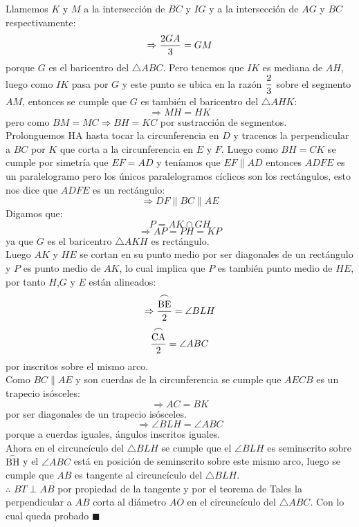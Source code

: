\documentclass{book}
\begin{document}
\begin{enumerate}
\begin{center}
        \end{center}
        Llamemos $K$ y $M$ a la intersección de $BC$ y $IG$ y a la intersección de $AG$ y $BC$ respectivamente:
        $$\Rightarrow{2GA\over 3}=GM$$
        porque $G$ es el baricentro del $\triangle ABC$. Pero tenemos que $IK$ es mediana de $AH$, luego como $IK$ pasa por $G$ y este punto se ubica en la razón  $\displaystyle{{2\over 3}}$  sobre el segmento $AM$, entonces se cumple que $G$ es también el baricentro del $\triangle AHK$:
        $$\Rightarrow MH=HK$$
        pero como $BM=MC\Rightarrow BH=KC$ por sustracción de segmentos.\\
        Prolonguemos HA hasta tocar la circunferencia en $D$ y tracenos la perpendicular a $BC$ por $K$ que corta a la circunferencia en $E$ y $F$. Luego como $BH=CK$ se cumple por simetría que $EF=AD$ y teníamos que $EF\parallel AD$ entonces $ADFE$ es un paralelogramo pero los únicos paralelogramos cíclicos son los rectángulos, esto nos dice que $ADFE$ es un rectángulo:\\
        $$\Rightarrow DF\parallel BC\parallel AE$$
        Digamos que:
        $$P=AK\cap GH$$
        $$\Rightarrow AP=PH=KP$$
        ya que $G$ es el baricentro $\triangle AKH$ es rectángulo.\\
        Luego $AK$ y $HE$ se cortan en su punto medio por ser diagonales de un rectángulo y $P$ es punto medio de $AK$, lo cual implica que $P$ es también punto medio de $HE$, por tanto $H$,$G$ y $E$ están alineados:
        $$\Rightarrow{\stackrel{\textstyle\frown}{\mathrm{BE}}\over 2}=\angle BLH$$
        $${\stackrel{\textstyle\frown}{\mathrm{CA}}\over 2}=\angle ABC$$
        por inscritos sobre el mismo arco.\\
        Como $BC\parallel AE$ y son cuerdas de la circunferencia se cumple que $AECB$ es un trapecio isósceles:
        $$\Rightarrow AC=BK$$
        por ser diagonales de un trapecio isósceles.
        $$\Rightarrow\angle BLH=\angle ABC$$
        porque a cuerdas iguales, ángulos inscritos iguales.\\
        Ahora en el circuncículo del $\triangle BLH$ se cumple que el $\angle BLH$ es seminscrito sobre $\stackrel{\textstyle\frown}{\mathrm{BH}}$ y el $\angle ABC$ está en posición de seminscrito sobre este mismo arco, luego se cumple que $AB$ es tangente al circuncículo del $\triangle BLH$.\\
        $\therefore$ $BT\perp AB$ por propiedad de la tangente y por el teorema de Tales la perpendicular a $AB$ corta al diámetro $AO$ en el circuncículo del $\triangle ABC$. Con lo cual queda probado $\blacksquare$\\

\end{enumerate}
\end{document}
